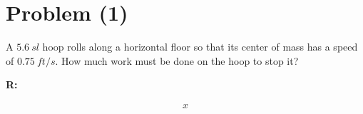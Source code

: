 \section{Problem (1)}
	A $5.6 \ sl$ hoop rolls along a horizontal floor so that its center of mass has a speed of $0.75 \ ft/s$. How much work must be done on the hoop to stop it?

	\textbf{R:}

	\begin{align}
		x
	\end{align}
